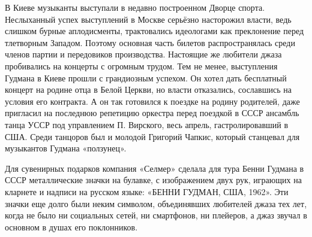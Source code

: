 
В Киеве музыканты выступали в недавно построенном Дворце спорта. Неслыханный
успех выступлений в Москве серьёзно насторожил власти, ведь слишком бурные
аплодисменты, трактовались идеологами как преклонение перед тлетворным Западом.
Поэтому основная часть билетов распространялась среди членов партии и
передовиков производства. Настоящие же любители джаза пробивались на концерты с
огромным трудом. Тем не менее, выступления Гудмана в Киеве прошли с грандиозным
успехом. Он хотел дать бесплатный концерт на родине отца в Белой Церкви, но
власти отказались, сославшись на условия его контракта. А он так готовился к
поездке на родину родителей, даже пригласил на последнюю репетицию оркестра
перед поездкой в СССР ансамбль танца УССР под управлением П. Вирского, весь
апрель, гастролировавший в США. Среди танцоров был и молодой Григорий Чапкис,
который станцевал для музыкантов Гудмана «ползунец».


Для сувенирных подарков компания «Селмер» сделала для тура Бенни Гудмана в СССР
металлические значки на булавке, с изображением двух рук, играющих на кларнете
и надписи на русском языке: «БЕННИ ГУДМАН, США, 1962». Эти значки еще долго
были неким символом, объединявших любителей джаза тех лет, когда не было ни
социальных сетей, ни смартфонов, ни плейеров, а джаз звучал в основном в душах
его поклонников.


